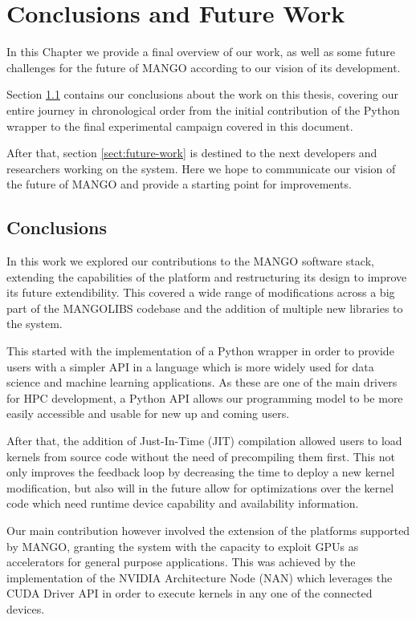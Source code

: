 \chapter{Conclusions and Future Work} \label{ch:Conclusions}

In this Chapter we provide a final overview of our work, as well as some future challenges for the future of MANGO according to our vision of its development.

Section \ref{sect:conclusions} contains our conclusions about the work on this thesis, covering our entire journey in chronological order from the initial contribution of the Python wrapper to the final experimental campaign covered in this document.

After that, section \ref{sect:future-work} is destined to the next developers and researchers working on the system. Here we hope to communicate our vision of the future of MANGO and provide a starting point for improvements. 

\section{Conclusions} \label{sect:conclusions}

In this work we explored our contributions to the MANGO software stack, extending the capabilities of the platform and restructuring its design to improve its future extendibility. This covered a wide range of modifications across a big part of the MANGOLIBS codebase and the addition of multiple new libraries to the system.

This started with the implementation of a Python wrapper in order to provide users with a simpler API in a language which is more widely used for data science and machine learning applications. As these are one of the main drivers for HPC development, a Python API allows our programming model to be more easily accessible and usable for new up and coming users.

After that, the addition of Just-In-Time (JIT) compilation allowed users to load kernels from source code without the need of precompiling them first. This not only improves the feedback loop by decreasing the time to deploy a new kernel modification, but also will in the future allow for optimizations over the kernel code which need runtime device capability and availability information.

Our main contribution however involved the extension of the platforms supported by MANGO, granting the system with the capacity to exploit GPUs as accelerators for general purpose applications. This was achieved by the implementation of the NVIDIA Architecture Node (NAN) which leverages the CUDA Driver API in order to execute kernels in any one of the connected devices. 

